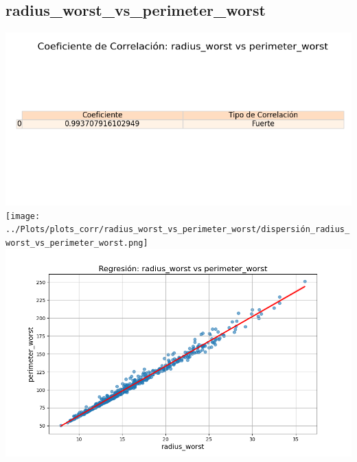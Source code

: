 \documentclass[a4paper, 12pt]{article}
\begin{document}
\subsection{radius\_worst\_vs\_perimeter\_worst}
    \includegraphics[width = \textwidth]{../Plots/plots_corr/radius_worst_vs_perimeter_worst/coeficiente_correlacion_radius_worst_vs_perimeter_worst.png}
    \texttt{[image: ../Plots/plots\_corr/radius\_worst\_vs\_perimeter\_worst/dispersión\_radius\_worst\_vs\_perimeter\_worst.png]}
    \includegraphics[width = \textwidth]{../Plots/plots_corr/radius_worst_vs_perimeter_worst/regresion_radius_worst_vs_perimeter_worst.png}
\end{document}
